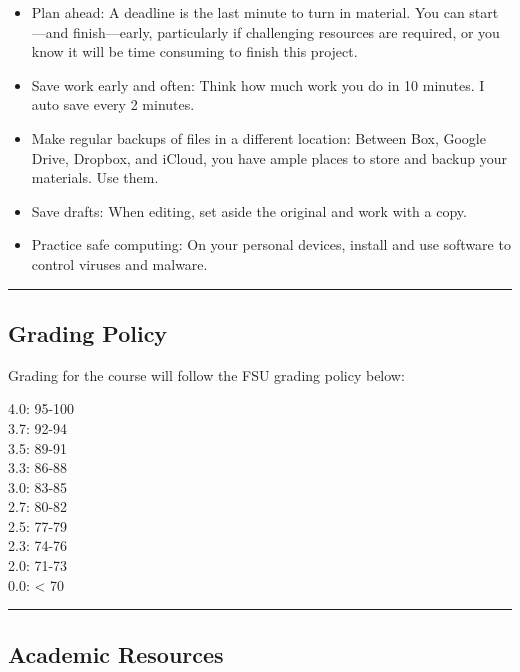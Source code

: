 \documentclass[
  letterpaper,
  DIV=11,
  numbers=noendperiod]{scrartcl}
\begin{document}
\begin{itemize}
\item
  Plan ahead: A deadline is the last minute to turn in material. You can
  start---and finish---early, particularly if challenging resources are
  required, or you know it will be time consuming to finish this
  project.
\item
  Save work early and often: Think how much work you do in 10 minutes. I
  auto save every 2 minutes.
\item
  Make regular backups of files in a different location: Between Box,
  Google Drive, Dropbox, and iCloud, you have ample places to store and
  backup your materials. Use them.
\item
  Save drafts: When editing, set aside the original and work with a
  copy.
\item
  Practice safe computing: On your personal devices, install and use
  software to control viruses and malware.
\end{itemize}

\begin{center}\rule{0.5\linewidth}{0.5pt}\end{center}

\hypertarget{grading-policy}{%
\subsection{Grading Policy}\label{grading-policy}}

Grading for the course will follow the FSU grading policy below:

4.0: 95-100\\
3.7: 92-94\\
3.5: 89-91\\
3.3: 86-88\\
3.0: 83-85\\
2.7: 80-82\\
2.5: 77-79\\
2.3: 74-76\\
2.0: 71-73\\
0.0: \textless{} 70

\begin{center}\rule{0.5\linewidth}{0.5pt}\end{center}

\hypertarget{academic-resources}{%
\subsection{Academic Resources}\label{academic-resources}}
\end{document}
